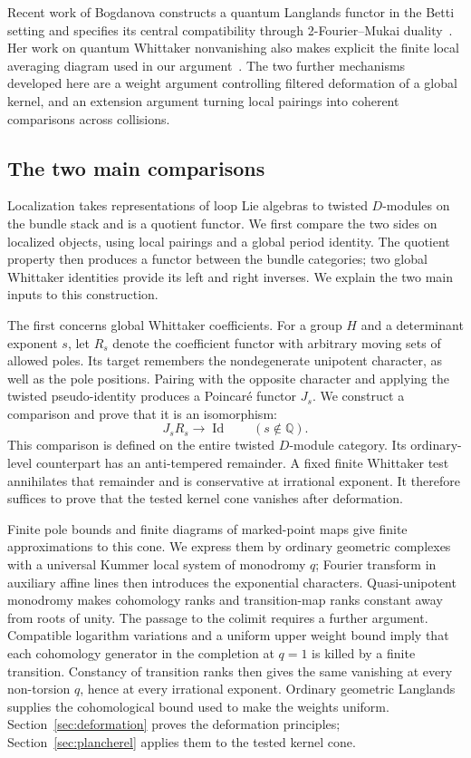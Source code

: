\documentclass[11pt]{article}
\numberwithin{equation}{section}
\theoremstyle{definition}
\theoremstyle{remark}
\begin{document}
Recent work of Bogdanova constructs a quantum Langlands functor in the
Betti setting and specifies its central compatibility through
2-Fourier--Mukai duality~\cite{BogdanovaBetti}. Her work on quantum
Whittaker nonvanishing also makes explicit the finite local averaging
diagram used in our argument~\cite{BogdanovaWhit}. The two further
mechanisms developed here are a
weight argument controlling filtered deformation of a global kernel,
and an extension argument turning local pairings into coherent
comparisons across collisions.

\subsection{The two main comparisons}

Localization takes representations of loop Lie algebras to twisted
$D$-modules on the bundle stack and is a quotient functor. We first
compare the two sides on localized objects, using local pairings and a
global period identity. The quotient property then produces a functor
between the bundle categories; two global Whittaker identities provide
its left and right inverses. We explain the two main inputs to this
construction.

The first concerns global Whittaker coefficients. For a group $H$ and a
determinant exponent $s$, let $R_s$ denote the coefficient functor with
arbitrary moving sets of allowed poles. Its target remembers the
nondegenerate unipotent character, as well as the pole positions. Pairing
with the opposite character and applying the twisted pseudo-identity
produces a Poincar\'e functor $J_s$. We construct a comparison and prove
that it is an isomorphism:
\begin{equation}\label{intro:plancherel}
                 J_sR_s\longrightarrow\operatorname{Id}
                 \qquad(s\notin\mathbb Q).
\end{equation}
This comparison is defined on the entire twisted $D$-module category.
Its ordinary-level counterpart has an anti-tempered remainder. A fixed
finite Whittaker test annihilates that remainder and is conservative at
irrational exponent. It therefore suffices to prove that the tested
kernel cone vanishes after deformation.

Finite pole bounds and finite diagrams of marked-point maps give finite
approximations to this cone. We express them by ordinary geometric
complexes with a universal Kummer local system of monodromy $q$;
Fourier transform in auxiliary affine lines then introduces the
exponential characters. Quasi-unipotent monodromy makes cohomology ranks
and transition-map ranks constant away from roots of unity. The passage
to the colimit requires a further argument. Compatible logarithm
variations and a uniform upper weight bound imply that each cohomology
generator in the completion at $q=1$ is killed by a finite transition.
Constancy of transition ranks then gives the same vanishing at every
non-torsion $q$, hence at every irrational exponent. Ordinary geometric
Langlands supplies the cohomological bound used to make the weights
uniform. Section~\ref{sec:deformation} proves the deformation principles;
Section~\ref{sec:plancherel} applies them to the tested kernel cone.
\end{document}
